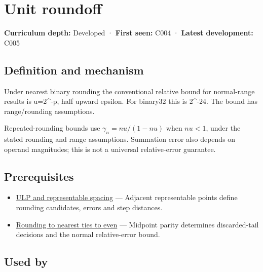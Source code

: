 \hypertarget{appendix-bc44f7b42f42}{}\label{referencestart:appendix-bc44f7b42f42}
\section{Unit roundoff}\label{appendix-bc44f7b42f42-unit-roundoff}

\textbf{Curriculum depth:} Developed · \textbf{First seen:} C004 · \textbf{Latest development:} C005

\begin{allmightroledefinition}

\subsection{Definition and mechanism}\label{appendix-bc44f7b42f42-definition-and-mechanism}

Under nearest binary rounding the conventional relative bound for normal-range results is u=2\^{}-p, half upward epsilon. For binary32 this is 2\^{}-24. The bound has range/rounding assumptions.

\end{allmightroledefinition}

Repeated-rounding bounds use \(\gamma_n=nu/(1-nu)\) when \(nu<1\), under the stated rounding and range assumptions. Summation error also depends on operand magnitudes; this is not a universal relative-error guarantee.

\subsection{Prerequisites}\label{appendix-bc44f7b42f42-prerequisites}

\begin{itemize}
\tightlist
\item
  \hyperref[appendix-14bab4cab9d4]{ULP and representable spacing} --- Adjacent representable points define rounding candidates, errors and step distances.
\item
  \hyperref[appendix-614afe1de592]{Rounding to nearest ties to even} --- Midpoint parity determines discarded-tail decisions and the normal relative-error bound.
\end{itemize}

\subsection{Used by}\label{appendix-bc44f7b42f42-used-by}

